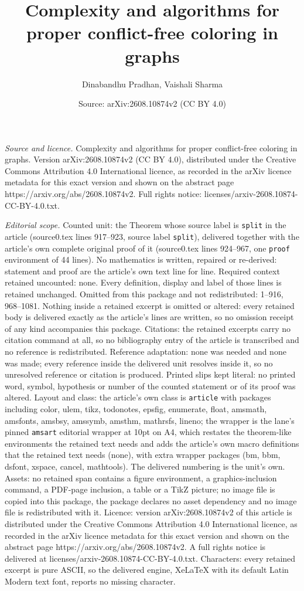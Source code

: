 \documentclass[10pt,a4paper]{amsart}
\title[Complexity and algorithms for proper conflict-free coloring ]{Complexity and algorithms for proper conflict-free coloring in graphs}
\author{Dinabandhu Pradhan, Vaishali Sharma}
\date{Source: arXiv:2608.10874v2 (CC BY 4.0)}
\begin{document}
\maketitle

\noindent\emph{Source and licence.} Complexity and algorithms for proper conflict-free coloring in graphs. Version arXiv:2608.10874v2 (CC BY 4.0), distributed under the Creative Commons Attribution 4.0 International licence, as recorded in the arXiv licence metadata for this exact version and shown on the abstract page https://arxiv.org/abs/2608.10874v2. Full rights notice: licenses/arxiv-2608.10874-CC-BY-4.0.txt.\par\smallskip

\noindent\textit{Editorial scope.} Counted unit: the Theorem whose source label is \texttt{split} in the article (source0.tex lines 917--923, source label \texttt{split}), delivered together with the article's own complete original proof of it (source0.tex lines 924--967, one \texttt{proof} environment of 44 lines). No mathematics is written, repaired or re-derived: statement and proof are the article's own text line for line. Required context retained uncounted: none. Every definition, display and label of those lines is retained unchanged. Omitted from this package and not redistributed: 1--916, 968--1081. Nothing inside a retained excerpt is omitted or altered: every retained body is delivered exactly as the article's lines are written, so no omission receipt of any kind accompanies this package. Citations: the retained excerpts carry no citation command at all, so no bibliography entry of the article is transcribed and no reference is redistributed. Reference adaptation: none was needed and none was made; every reference inside the delivered unit resolves inside it, so no unresolved reference or citation is produced. Printed slips kept literal: no printed word, symbol, hypothesis or number of the counted statement or of its proof was altered. Layout and class: the article's own class is \texttt{article} with packages including color, ulem, tikz, todonotes, epsfig, enumerate, float, amsmath, amsfonts, amsbsy, amssymb, amsthm, mathrsfs, lineno; the wrapper is the lane's pinned \texttt{amsart} editorial wrapper at 10pt on A4, which restates the theorem-like environments the retained text needs and adds the article's own macro definitions that the retained text needs (none), with extra wrapper packages (bm, bbm, dsfont, xspace, cancel, mathtools). The delivered numbering is the unit's own. Assets: no retained span contains a figure environment, a graphics-inclusion command, a PDF-page inclusion, a table or a TikZ picture; no image file is copied into this package, the package declares no asset dependency and no image file is redistributed with it. Licence: version arXiv:2608.10874v2 of this article is distributed under the Creative Commons Attribution 4.0 International licence, as recorded in the arXiv licence metadata for this exact version and shown on the abstract page https://arxiv.org/abs/2608.10874v2. A full rights notice is delivered at licenses/arxiv-2608.10874-CC-BY-4.0.txt. Characters: every retained excerpt is pure ASCII, so the delivered engine, XeLaTeX with its default Latin Modern text font, reports no missing character.
\end{document}
